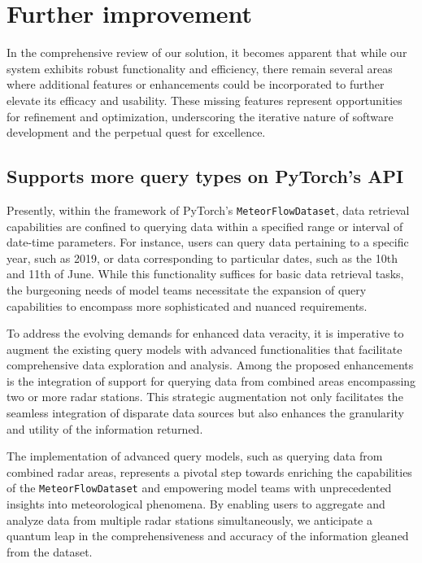 \section{Further improvement}
In the comprehensive review of our solution, it becomes apparent that while our
system exhibits robust functionality and efficiency, there remain several areas
where additional features or enhancements could be incorporated to further
elevate its efficacy and usability. These missing features represent
opportunities for refinement and optimization, underscoring the iterative nature
of software development and the perpetual quest for excellence.

\subsection{Supports more query types on PyTorch's API}

Presently, within the framework of PyTorch's \texttt{MeteorFlowDataset}, data
retrieval capabilities are confined to querying data within a specified range or
interval of date-time parameters. For instance, users can query data pertaining
to a specific year, such as 2019, or data corresponding to particular dates,
such as the 10th and 11th of June. While this functionality suffices for basic
data retrieval tasks, the burgeoning needs of model teams necessitate the
expansion of query capabilities to encompass more sophisticated and nuanced
requirements.

To address the evolving demands for enhanced data veracity, it is imperative to
augment the existing query models with advanced functionalities that facilitate
comprehensive data exploration and analysis. Among the proposed enhancements is
the integration of support for querying data from combined areas encompassing
two or more radar stations. This strategic augmentation not only facilitates the
seamless integration of disparate data sources but also enhances the granularity
and utility of the information returned.

The implementation of advanced query models, such as querying data from combined
radar areas, represents a pivotal step towards enriching the capabilities of the
\texttt{MeteorFlowDataset} and empowering model teams with unprecedented
insights into meteorological phenomena. By enabling users to aggregate and
analyze data from multiple radar stations simultaneously, we anticipate a
quantum leap in the comprehensiveness and accuracy of the information gleaned
from the dataset.



